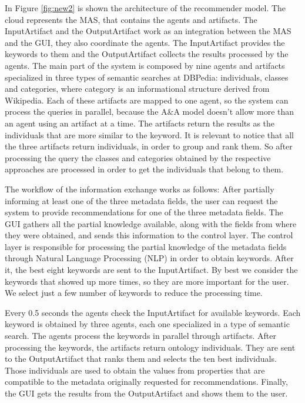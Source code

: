 \documentclass[a4paper,twoside]{article}
\begin{document}
In Figure \ref{fig:new2} is shown the architecture of the recommender model. The cloud represents the MAS, that contains the agents and artifacts. The InputArtifact and the OutputArtifact work as an integration between the MAS and the GUI, they also coordinate the agents. The InputArtifact provides the keywords to them and the OutputArtifact collects the results processed by the agents. The main part of the system is composed by nine agents and artifacts specialized in three types of semantic searches at DBPedia: individuals, classes and categories, where category is an informational structure derived from Wikipedia. Each of these artifacts are mapped to one agent, so the system can process the queries in parallel, because the A\&A model doesn't allow more than an agent using an artifact at a time. The artifacts return the results as the individuals that are more similar to the keyword. It is relevant to notice that all the three artifacts return individuals, in order to group and rank them. So after processing the query the classes and categories obtained by the respective approaches are processed in order to get the individuals that belong to them.

\begin{figure*}[!h]
  \centering
   {}
  \caption{Overview of the recommender model.}
  \label{fig:new2}
 \end{figure*}

The workflow of the information exchange works as follows: After partially informing at least one of the three metadata fields, the user can request the system to provide recommendations for one of the three metadata fields. The GUI gathers all the partial knowledge available, along with the fields from where they were obtained, and sends this information to the control layer. The control layer is responsible for processing the partial knowledge of the metadata fields through Natural Language Processing (NLP) in order to obtain keywords. After it, the best eight keywords are sent to the InputArtifact. By best we consider the keywords that showed up more times, so they are more important for the user. We select just a few number of keywords to reduce the processing time.

Every 0.5 seconds the agents check the InputArtifact for available keywords. Each keyword is obtained by three agents, each one specialized in a type of semantic search. The agents process the keywords in parallel through artifacts. After processing the keywords, the artifacts return ontology individuals. They are sent to the OutputArtifact that ranks them and selects the ten best individuals. Those individuals are used to obtain the values from properties that are compatible to the metadata originally requested for recommendations. Finally, the GUI gets the results from the OutputArtifact and shows them to the user.
\end{document}
